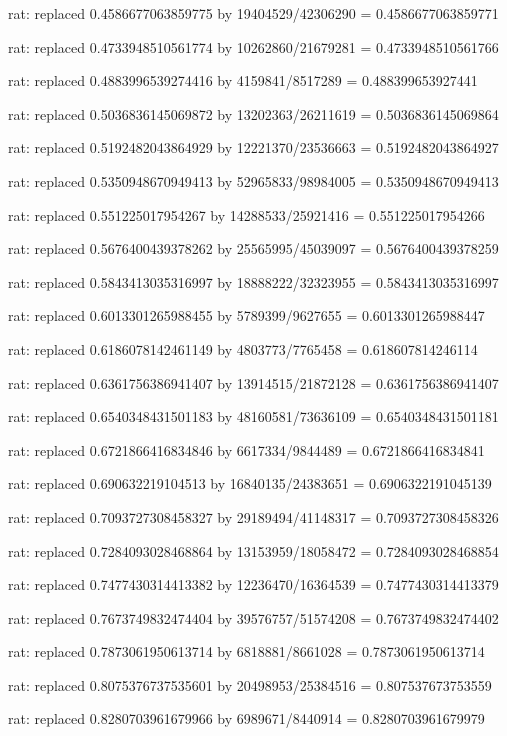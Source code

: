 \documentclass[a4paper,10pt]{article}
\begin{document}
\begin{eulernotebook}
\begin{eulercomment}
\begin{eulercomment}
\begin{eulercomment}
\begin{eulercomment}
\begin{eulercomment}
\begin{eulercomment}
\begin{eulercomment}
\begin{eulercomment}
\begin{eulercomment}
\begin{eulercomment}
\begin{eulercomment}
\begin{eulercomment}
\begin{eulercomment}
\begin{eulercomment}
\begin{eulercomment}
\begin{eulercomment}
\begin{euleroutput}
  rat: replaced 0.4586677063859775 by 19404529/42306290 = 0.4586677063859771
  
  rat: replaced 0.4733948510561774 by 10262860/21679281 = 0.4733948510561766
  
  rat: replaced 0.4883996539274416 by 4159841/8517289 = 0.488399653927441
  
  rat: replaced 0.5036836145069872 by 13202363/26211619 = 0.5036836145069864
  
  rat: replaced 0.5192482043864929 by 12221370/23536663 = 0.5192482043864927
  
  rat: replaced 0.5350948670949413 by 52965833/98984005 = 0.5350948670949413
  
  rat: replaced 0.551225017954267 by 14288533/25921416 = 0.551225017954266
  
  rat: replaced 0.5676400439378262 by 25565995/45039097 = 0.5676400439378259
  
  rat: replaced 0.5843413035316997 by 18888222/32323955 = 0.5843413035316997
  
  rat: replaced 0.6013301265988455 by 5789399/9627655 = 0.6013301265988447
  
  rat: replaced 0.6186078142461149 by 4803773/7765458 = 0.618607814246114
  
  rat: replaced 0.6361756386941407 by 13914515/21872128 = 0.6361756386941407
  
  rat: replaced 0.6540348431501183 by 48160581/73636109 = 0.6540348431501181
  
  rat: replaced 0.6721866416834846 by 6617334/9844489 = 0.6721866416834841
  
  rat: replaced 0.690632219104513 by 16840135/24383651 = 0.6906322191045139
  
  rat: replaced 0.7093727308458327 by 29189494/41148317 = 0.7093727308458326
  
  rat: replaced 0.7284093028468864 by 13153959/18058472 = 0.7284093028468854
  
  rat: replaced 0.7477430314413382 by 12236470/16364539 = 0.7477430314413379
  
  rat: replaced 0.7673749832474404 by 39576757/51574208 = 0.7673749832474402
  
  rat: replaced 0.7873061950613714 by 6818881/8661028 = 0.7873061950613714
  
  rat: replaced 0.8075376737535601 by 20498953/25384516 = 0.807537673753559
  
  rat: replaced 0.8280703961679966 by 6989671/8440914 = 0.8280703961679979
  

\end{euleroutput}
\end{eulercomment}
\end{eulercomment}
\end{eulercomment}
\end{eulercomment}
\end{eulercomment}
\end{eulercomment}
\end{eulercomment}
\end{eulercomment}
\end{eulercomment}
\end{eulercomment}
\end{eulercomment}
\end{eulercomment}
\end{eulercomment}
\end{eulercomment}
\end{eulercomment}
\end{eulercomment}
\end{eulernotebook}
\end{document}
